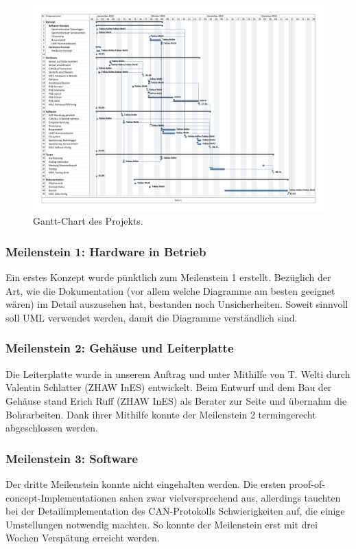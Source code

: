 \begin{figure}
	\centering		\includegraphics[angle=270,width=1\textwidth]{images/gantt.pdf}
	\caption{Gantt-Chart des Projekts.}
	\label{fig.gantt}
\end{figure}

\subsubsection{Meilenstein 1: Hardware in Betrieb}
Ein erstes Konzept wurde pünktlich zum Meilenstein 1 erstellt. Bezüglich der Art, wie die Dokumentation (vor allem welche Diagramme am besten geeignet wären) im Detail auszusehen hat, bestanden noch Unsicherheiten. Soweit sinnvoll soll UML verwendet werden, damit die Diagramme verständlich sind.

\subsubsection{Meilenstein 2: Gehäuse und Leiterplatte}
Die Leiterplatte wurde in unserem Auftrag und unter Mithilfe von T. Welti durch Valentin Schlatter (ZHAW InES) entwickelt. Beim Entwurf und dem Bau der Gehäuse stand Erich Ruff (ZHAW InES) als Berater zur Seite und übernahm die Bohrarbeiten. Dank ihrer Mithilfe konnte der Meilenstein 2 termingerecht abgeschlossen werden.

\subsubsection{Meilenstein 3: Software}
Der dritte Meilenstein konnte nicht eingehalten werden. Die ersten proof-of-concept-Implementationen sahen zwar vielversprechend aus, allerdings tauchten bei der Detailimplementation des CAN-Protokolls Schwierigkeiten auf, die einige Umstellungen notwendig machten. So konnte der Meilenstein erst mit drei Wochen Verspätung erreicht werden.

